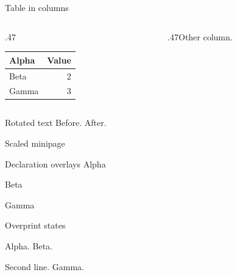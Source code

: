 \documentclass[aspectratio=169]{beamer}
\begin{document}
\begin{frame}{Table in columns}
  \begin{columns}[T,totalwidth=\textwidth]
    \begin{column}{.47\textwidth}
      \begin{table}
        \begin{tabular}{lr}
          \toprule
          Alpha & Value\\
          \midrule
          Beta & 2\\
          Gamma & 3\\
          \bottomrule
        \end{tabular}
      \end{table}
    \end{column}
    \begin{column}{.47\textwidth}Other column.\end{column}
  \end{columns}
\end{frame}

\begin{frame}{Rotated text}
  Before.
  After.
\end{frame}

\begin{frame}{Scaled minipage}
\end{frame}

\begin{frame}{Declaration overlays}
  Alpha\par
  Beta\par
  Gamma\par
\end{frame}

\begin{frame}{Overprint states}
  \begin{overprint}
    Alpha.
    Beta.\par Second line.
    Gamma.
  \end{overprint}
\end{frame}
\end{document}
